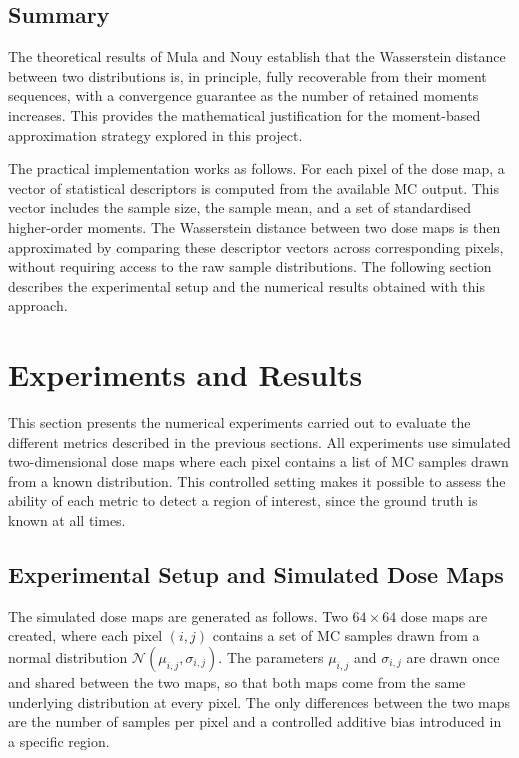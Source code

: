\documentclass[12pt]{article}
\begin{document}
\subsection{Summary}

The theoretical results of Mula and Nouy establish that the Wasserstein distance
between two distributions is, in principle, fully recoverable from their moment
sequences, with a convergence guarantee as the number of retained moments increases.
This provides the mathematical justification for the moment-based approximation
strategy explored in this project.

The practical implementation works as follows. For each pixel of the dose map, a
vector of statistical descriptors is computed from the available MC output. This
vector includes the sample size, the sample mean, and a set of standardised
higher-order moments. The Wasserstein distance between two dose maps is then
approximated by comparing these descriptor vectors across corresponding pixels,
without requiring access to the raw sample distributions. The following section
describes the experimental setup and the numerical results obtained with this
approach.

\newpage

\section{Experiments and Results}
 
This section presents the numerical experiments carried out to evaluate the
different metrics described in the previous sections. All experiments use
simulated two-dimensional dose maps where each pixel contains a list of MC
samples drawn from a known distribution. This controlled setting makes it
possible to assess the ability of each metric to detect a region of interest,
since the ground truth is known at all times.
 
\subsection{Experimental Setup and Simulated Dose Maps}
 
The simulated dose maps are generated as follows. Two $64 \times 64$ dose maps
are created, where each pixel $(i,j)$ contains a set of MC samples drawn from a
normal distribution $\mathcal{N}(\mu_{i,j}, \sigma_{i,j})$. The parameters
$\mu_{i,j}$ and $\sigma_{i,j}$ are drawn once and shared between the two maps,
so that both maps come from the same underlying distribution at every pixel.
The only differences between the two maps are the number of samples per pixel
and a controlled additive bias introduced in a specific region.
 
\end{document}
